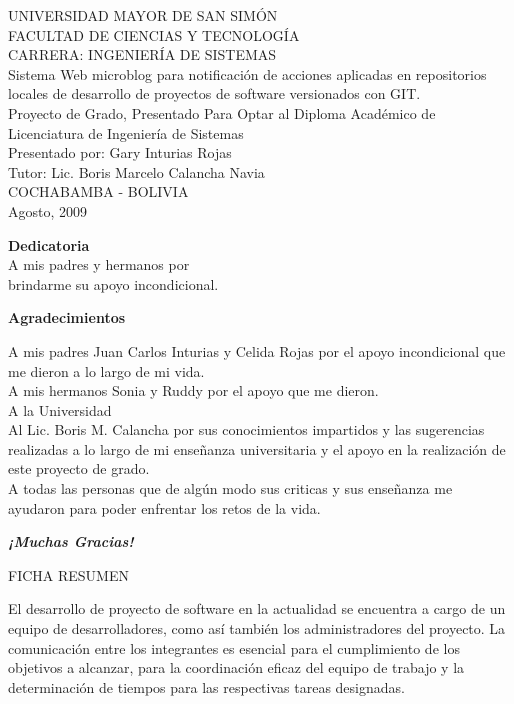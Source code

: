 \documentclass[letterpaper, 12pt,double,graphicx,caption,rotating]{report}
\begin{document}
\begin{titlepage}
\newpage
\begin{center}
UNIVERSIDAD MAYOR DE SAN SIMÓN\\
FACULTAD DE CIENCIAS Y TECNOLOGÍA\\
CARRERA: INGENIERÍA DE SISTEMAS\\[3cm]
{\Large Sistema Web microblog para notificación de acciones aplicadas en repositorios locales de desarrollo de proyectos de software versionados con GIT.}\\[2cm]
{\Large Proyecto de Grado, Presentado Para Optar al Diploma Académico de Licenciatura de Ingeniería de Sistemas}\\[2cm]
{\Large Presentado por: Gary Inturias Rojas}\\[1cm]
{\Large Tutor: Lic. Boris Marcelo Calancha Navia }\\[2PT]
COCHABAMBA - BOLIVIA\\
Agosto, 2009
\end{center}
\newpage

\begin{flushright}
    {\Large \textbf{Dedicatoria}}\\[1cm]
    A mis padres y hermanos por\\ brindarme su apoyo incondicional. \\
\end{flushright}
\newpage
\begin{center}
{\Large \textbf{Agradecimientos}}\\[2cm]
{\leftskip=8cm
A mis padres Juan Carlos Inturias y Celida Rojas por el apoyo incondicional que me dieron a lo largo de mi vida.\\
A mis hermanos Sonia y Ruddy por el apoyo que me dieron.\\
A la Universidad\\
Al Lic. Boris M. Calancha por sus conocimientos impartidos y las sugerencias realizadas a lo largo de mi enseñanza universitaria y el apoyo en la realización de este proyecto de grado.\\
A todas las personas que de algún modo sus criticas y sus enseñanza me ayudaron para poder enfrentar los retos de la vida.\\[3cm]
\par}
\textbf{\textit{¡Muchas Gracias!}}
\end{center}
\newpage
\begin{center}
 {\Large FICHA RESUMEN}\\
\end{center}
El desarrollo de proyecto de software en la actualidad se encuentra a cargo de un equipo de desarrolladores, como así también los administradores del proyecto.
La comunicación entre los integrantes es esencial para el cumplimiento de los objetivos a alcanzar, para la coordinación eficaz del equipo de trabajo y la determinación de tiempos para las respectivas tareas designadas.


\end{titlepage}
\end{document}
